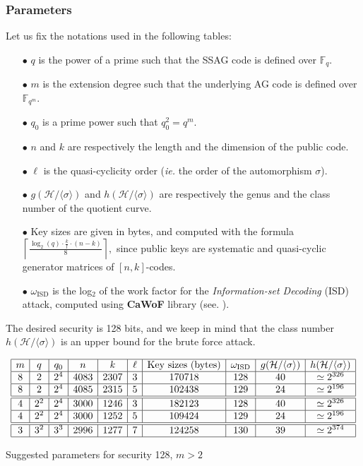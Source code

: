 \documentclass[10pt]{article}
\theoremstyle{definition}
\theoremstyle{definition}
\theoremstyle{definition}
\newcommand{\cd}{\cdot}
\newcommand{\calH}{\mathcal{H}}
\newcommand{\fqm}{\mathbb{F}_{q^m}}
\newcommand{\fq}{\mathbb{F}_q}
\newcommand{\w}{\omega}
\begin{document}
\subsubsection{Parameters} \label{some parameters}


Let us fix the notations used in the following tables:

\begin{enumerate}
\item[$\bullet$] $q$ is the power of a prime such that the SSAG code is defined over $\fq$.
\item[$\bullet$] $m$ is the extension degree such that the underlying AG code is defined over $\fqm$.
\item[$\bullet$] $q_0$ is a prime power such that $q_0^2=q^m$.
\item[$\bullet$] $n$ and $k$ are respectively the length and the dimension of the public code.
\item[$\bullet$] $\ell$ is the quasi-cyclicity order (\textit{ie.} the order of the automorphism $\sigma$).  
\item[$\bullet$] $g(\calH/\langle \sigma \rangle)$ and $h(\calH/\langle \sigma \rangle)$ are respectively the genus and the class number of the quotient curve.
\item[$\bullet$] Key sizes are given in bytes, and computed with the formula $\left\lceil \frac{\log_{2}(q) \cd \frac{k}{l} \cd (n-k)}{8} \right\rceil,$ since public keys are systematic and quasi-cyclic generator matrices of $[n,k]$-codes.
\item[$\bullet$] $\w_{\mathrm{ISD}}$ is the log$_2$ of the work factor for the \textit{Information-set Decoding} (ISD) attack, computed using \textbf{CaWoF} library (see. \cite{CAWOF}).
\end{enumerate}
The desired security is 128 bits, and we keep in mind that the class number $h(\calH/\langle \sigma \rangle)$ is an upper bound for the brute force attack. 

\begin{table}[htbp]
\begin{equation*}
\begin{array}{|c|c|c|c|c|c|c|c|c|c|}
\hline
m & q & q_0 & n & k & \ell & \mathrm{Key} \ \mathrm{sizes} \ (\mathrm{bytes}) & \w_{\mathrm{ISD}} & g(\calH/\langle \sigma \rangle) & h(\calH/\langle \sigma \rangle) \\
\hline
8 & 2 & 2^4 & 4083 & 2307 & 3 & 170718 & 128 & 40 & \simeq 2^{326} \\
\hline
8 & 2 & 2^4 & 4085 & 2315 & 5 & 102438 & 129 & 24 & \simeq 2^{196} \\
\hline \hline
4 & 2^2 & 2^4 & 3000 & 1246 & 3 & 182123 & 128 & 40 & \simeq 2^{326} \\
\hline
4 & 2^2 & 2^4 & 3000 & 1252 & 5 & 109424 & 129 & 24 & \simeq 2^{196} \\
\hline \hline
3 & 3^2 & 3^3 & 2996 & 1277 & 7 & 124258 & 130 & 39 & \simeq 2^{374} \\
\hline
\end{array}
\end{equation*}
\caption{Suggested parameters for security 128, $m > 2$}
\end{table}
\end{document}
